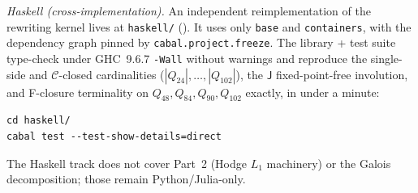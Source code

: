 \documentclass[12pt,a4paper]{article}
\theoremstyle{definition}
\theoremstyle{remark}
\newcommand{\Ccls}{\mathcal{C}}             %
\newcommand{\Jconj}{\mathsf{J}}             %
\begin{document}
\emph{Haskell (cross-implementation).} An independent reimplementation
of the rewriting kernel lives at \texttt{haskell/}
(\cite{haskell-cfs-kernel}). It uses only \texttt{base} and
\texttt{containers}, with the dependency graph pinned by
\texttt{cabal.project.freeze}. The library + test suite type-check
under GHC~9.6.7 \texttt{-Wall} without warnings and reproduce the
single-side and $\Ccls$-closed cardinalities ($|Q_{24}|, \dots,
|Q_{102}|$), the $\Jconj$ fixed-point-free involution, and F-closure
terminality on $Q_{48}, Q_{84}, Q_{90}, Q_{102}$ exactly, in under a
minute:
\begin{verbatim}
cd haskell/
cabal test --test-show-details=direct
\end{verbatim}
The Haskell track does not cover Part~2 (Hodge $L_1$ machinery) or the
Galois decomposition; those remain Python/Julia-only.
\end{document}
